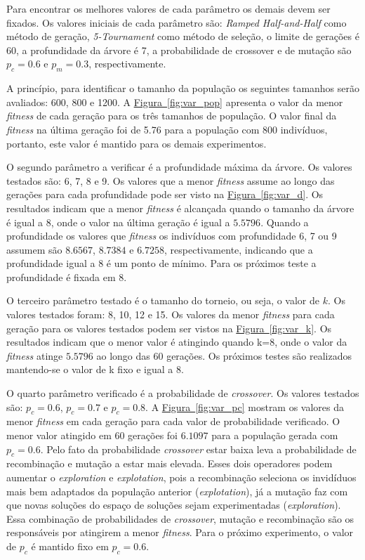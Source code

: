\documentclass[a4paper]{article}
\begin{document}
Para encontrar os melhores valores de cada parâmetro os demais devem ser fixados.
Os valores iniciais de cada parâmetro são: \textit{Ramped Half-and-Half} como
método de geração, \textit{5-Tournament} como método de seleção, o limite de
gerações é 60, a profundidade da árvore é 7, a probabilidade de crossover e de
mutação são $p_c=0.6$ e $p_m=0.3$, respectivamente.

A princípio, para identificar o tamanho da população os seguintes tamanhos serão
avaliados: 600, 800 e 1200. A \hyperref[fig:var_pop]{Figura~\ref*{fig:var_pop}}
apresenta o valor da menor \textit{fitness} de cada geração para os três tamanhos
de população. O valor final da \textit{fitness} na última geração foi de 5.76
para a população com 800 indivíduos, portanto, este valor é mantido para os
demais experimentos.


O segundo parâmetro a verificar é a profundidade máxima da árvore. Os valores
testados são: 6, 7, 8 e 9. Os valores que a menor \textit{fitness} assume ao
longo das gerações para cada profundidade pode ser visto na
\hyperref[fig:var_d]{Figura~\ref*{fig:var_d}}. Os resultados indicam que a menor
\textit{fitness} é alcançada quando o tamanho da árvore é igual a 8, onde o
valor na última geração é igual a $5.5796$. Quando a profundidade os valores que
\textit{fitness} os indivíduos com profundidade 6, 7 ou 9 assumem são $8.6567$,
$8.7384$ e $6.7258$, respectivamente, indicando que a profundidade igual a 8 é
um ponto de mínimo. Para os próximos teste a profundidade é fixada em 8.


O terceiro parâmetro testado é o tamanho do torneio, ou seja, o valor de $k$.
Os valores testados foram: 8, 10, 12 e 15. Os valores da menor \textit{fitness}
para cada geração para os valores testados podem ser vistos na
\hyperref[fig:var_k]{Figura~\ref*{fig:var_k}}.  Os resultados indicam que o
menor valor é atingindo quando k=8, onde o valor da \textit{fitness} atinge
$5.5796$ ao longo das 60 gerações. Os próximos testes são realizados mantendo-se
o valor de k fixo e igual a 8.

O quarto parâmetro verificado é a probabilidade de \textit{crossover}. Os
valores testados são: $p_c=0.6$, $p_c=0.7$ e $p_c=0.8$. A
\hyperref[fig:var_pc]{Figura~\ref*{fig:var_pc}} mostram os valores da menor
\textit{fitness} em cada geração para cada valor de probabilidade verificado.  O
menor valor atingido em 60 gerações foi $6.1097$ para a população gerada com
$p_c=0.6$. Pelo fato da probabilidade \textit{crossover} estar baixa leva a
probabilidade de recombinação e mutação a estar mais elevada. Esses dois
operadores podem aumentar o \textit{exploration} e \textit{explotation}, pois a
recombinação seleciona os invidíduos mais bem adaptados da população anterior
(\textit{explotation}), já a mutação faz com que novas soluções do espaço de
soluções sejam experimentadas (\textit{exploration}). Essa combinação de
probabilidades de \textit{crossover}, mutação e recombinação são os responsáveis
por atingirem a menor \textit{fitness}. Para o próximo experimento, o valor de
$p_c$ é mantido fixo em $p_c=0.6$.
\end{document}
